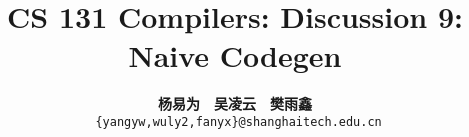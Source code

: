 \documentclass[a4paper]{article}
\title{CS 131 Compilers: Discussion 9: Naive Codegen}
\author{\textbf{杨易为}~~\textbf{吴凌云}~~\textbf{樊雨鑫} \\ \texttt{ \{yangyw,wuly2,fanyx\}@shanghaitech.edu.cn}}
\theoremstyle{definition}
\begin{document}
\maketitle
\section{}
\end{document}
